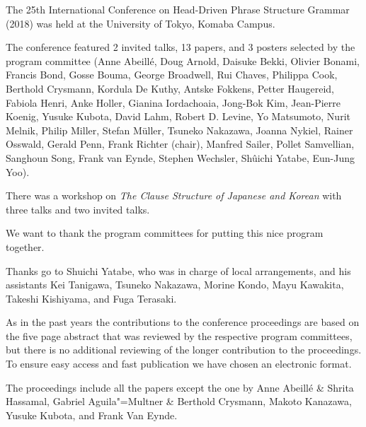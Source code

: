 The 25th International Conference on Head-Driven Phrase Structure Grammar (2018) was held at
the University of Tokyo, Komaba Campus.

The conference featured 2 invited talks, 13 papers, and 3 posters selected by the program committee 
(Anne Abeillé,
Doug Arnold,
Daisuke Bekki,
Olivier Bonami,
Francis Bond,
Gosse Bouma,
George Broadwell,
Rui Chaves,
Philippa Cook,
Berthold Crysmann,
Kordula De Kuthy,
Antske Fokkens,
Petter Haugereid,
Fabiola Henri,
Anke Holler,
Gianina Iordachoaia,
Jong-Bok Kim,
Jean-Pierre Koe\-nig,
Yusuke Kubota,
David Lahm,
Robert D. Levine,
Yo Matsumoto,
Nurit Melnik,
Philip Miller,
Stefan Müller,
Tsuneko Nakazawa,
Joanna Nykiel,
Rainer Osswald,
Gerald Penn,
Frank Richter (chair),
Manfred Sailer,
Pollet Samvellian,
Sanghoun Song,
Frank van Eynde,
Stephen Wechsler,
Shûichi Yatabe,
Eun-Jung Yoo).

There was a workshop on \emph{The Clause Structure of Japanese and Korean} with three talks and two
invited talks.

We want to thank the program committees for putting this nice program together.

Thanks go to Shuichi Yatabe, who was in charge of local arrangements, and his assistants Kei Tanigawa,
Tsuneko Nakazawa,
Morine Kondo,
Mayu Kawakita,
Takeshi Kishiyama, and
Fuga Terasaki.
 

As in the past years the contributions to the conference proceedings are based on the five page abstract
that was reviewed by the respective program committees, but there is no additional reviewing of the
longer contribution to the proceedings.
To ensure easy access and fast publication we have chosen an electronic format.

The proceedings include all the papers except the one by Anne Abeillé \& Shrita Hassamal, Gabriel Aguila"=Multner \&
Berthold Crysmann, Makoto Kanazawa, Yusuke Kubota, and Frank Van Eynde. 


